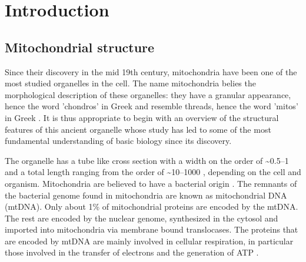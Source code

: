 \chapter{Introduction}
\clearpage
\section{Mitochondrial structure}
Since their discovery in the mid 19th century, mitochondria have been one of the most studied organelles in the cell. The name mitochondria belies the morphological description of these organelles: they have a granular appearance, hence the word 'chondros' in Greek and resemble threads, hence the word 'mitos' in Greek \cite{zick_cristae_2009}. It is thus appropriate to begin with an overview of the structural features of this ancient organelle whose study has led to some of the most fundamental understanding of basic biology since its discovery.

The organelle has a tube like cross section with a width on the order of \textasciitilde{\numrange{.5}{1} \si{\micron}}  and a total length ranging from the order of \textasciitilde{\numrange{10}{1000} \si{\micron}}, depending on the cell and organism. Mitochondria are believed to have a bacterial origin \cite{gray_mitochondrial_1999}. The remnants of the bacterial genome found in mitochondria are known as mitochondrial DNA (mtDNA). Only about 1\% of mitochondrial proteins are encoded by the mtDNA. The rest are encoded by the nuclear genome, synthesized in the cytosol and imported into mitochondria via membrane bound translocases. The proteins that are encoded by mtDNA are mainly involved in cellular respiration, in particular those involved in the transfer of electrons and the generation of ATP \cite{mishra_mitochondrial_2014}. 

